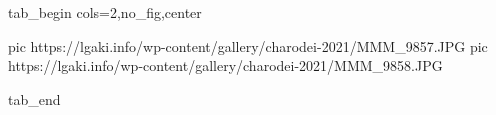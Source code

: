  
 
 
 
 

\ifcmt
  tab_begin cols=2,no_fig,center

     pic https://lgaki.info/wp-content/gallery/charodei-2021/MMM_9857.JPG
		 pic https://lgaki.info/wp-content/gallery/charodei-2021/MMM_9858.JPG

  tab_end
\fi
